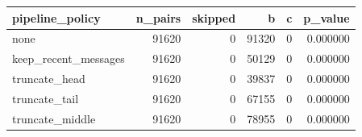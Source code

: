 \begin{tabular}{lrrrrr}
\toprule
pipeline_policy & n_pairs & skipped & b & c & p_value \\
\midrule
none & 91620 & 0 & 91320 & 0 & 0.000000 \\
keep_recent_messages & 91620 & 0 & 50129 & 0 & 0.000000 \\
truncate_head & 91620 & 0 & 39837 & 0 & 0.000000 \\
truncate_tail & 91620 & 0 & 67155 & 0 & 0.000000 \\
truncate_middle & 91620 & 0 & 78955 & 0 & 0.000000 \\
\bottomrule
\end{tabular}
